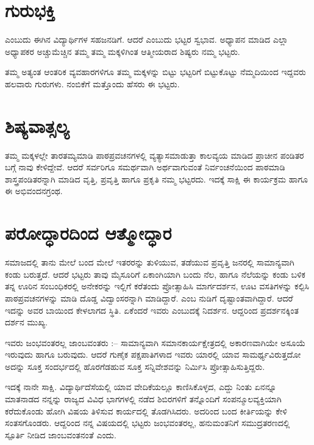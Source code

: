 \section*{ಗುರುಭಕ್ತಿ}  

   ಎಂಬುದು ಈಗಿನ ವಿದ್ಯಾರ್ಥಿಗಳ ಸಹಜನಡಿಗೆ.  ಆದರೆ   ಎಂಬುದು ಭಟ್ಟರ ಸ್ವಭಾವ.  ಅಧ್ಯಾಪನ ಮಾಡಿದ ಎಲ್ಲಾ ಅಧ್ಯಾಪಕರ ಅಚ್ಚುಮೆಚ್ಚಿನ ತಮ್ಮ ತಮ್ಮ ಮಕ್ಕಳಿಗಿಂತ ಆತ್ಮೀಯರಾದ ಶಿಷ್ಯರು ನಮ್ಮ ಭಟ್ಟರು.

ತಮ್ಮ ಅತ್ಯಂತ ಆಂತರಿಕ ವ್ಯವಹಾರಗಳಿಗೂ ತಮ್ಮ ಮಕ್ಕಳನ್ನು ಬಿಟ್ಟು ಭಟ್ಟರಿಗೆ ಬಿಟ್ಟುಕೊಟ್ಟು ನೆಮ್ಮದಿಯಿಂದ ಇದ್ದವರು ಹಲವಾರು ಗುರುಗಳು. ನಂಬಿಕೆಗೆ ಮತ್ತೊಂದು ಹೆಸರು ಈ ಭಟ್ಟರು.

\section*{ಶಿಷ್ಯವಾತ್ಸಲ್ಯ} 

ತಮ್ಮ ಮಕ್ಕಳಲ್ಲೇ ತಾರತಮ್ಯಮಾಡಿ ಪಾಠಪ್ರವಚನಗಳಲ್ಲಿ ವ್ಯತ್ಯಾಸಮಾಡುತ್ತಾ ಕಾಲವ್ಯಯ ಮಾಡಿದ ಪ್ರಾಚೀನ ಪಂಡಿತರ ಬಗ್ಗೆ ನಾವು ಕೇಳಿದ್ದೇವೆ.  ಆದರೆ ಸರ್ವರಿಗೂ ಸಮರ್ಥವಾಗಿ ಅರ್ಥವಾಗುವಂತೆ ನಿರ್ವಂಚನೆಯಿಂದ ಪಾಠಮಾಡಿ ಶಾಸ್ತ್ರಪಂಡಿತರನ್ನಾಗಿ ಮಾಡಿದ ವೃತ್ತಿ, ಪ್ರವೃತ್ತಿ ಹಾಗೂ ಪ್ರಕೃತಿ ನಮ್ಮ ಭಟ್ಟರದು.  ಇದಕ್ಕೆ ಸಾಕ್ಷಿ ಈ ಕಾರ್ಯಕ್ರಮ ಹಾಗೂ ಈ ಅಭಿವಂದನಗ್ರಂಥ.

\section*{ಪರೋದ್ಧಾರದಿಂದ ಆತ್ಮೋದ್ಧಾರ} 

ಸಮಾಜದಲ್ಲಿ ತಾನು ಮೇಲೆ ಬಂದ ಮೇಲೆ ಇತರರನ್ನು ತುಳಿಯುವ, ತಡೆಯುವ ಪ್ರವೃತ್ತಿ ಜನರಲ್ಲಿ ಸಾಮಾನ್ಯವಾಗಿ ಕಂಡು ಬರುತ್ತದೆ.  ಆದರೆ ಭಟ್ಟರು ತಾವು ಮೈಸೂರಿಗೆ ಏಕಾಂಗಿಯಾಗಿ ಬಂದು ನೆಲ, ಹಾಗೂ ನೆಲೆಯನ್ನು ಕಂಡು ಬಳಿಕ ತನ್ನ ಊರಿನ  ಸಂಬಂಧಿಕರಲ್ಲಿ ಅನೇಕರನ್ನು ಇಲ್ಲಿಗೆ ಕರೆತಂದು ಪ್ರೋತ್ಸಾಹಿಸಿ ಮಾರ್ಗದರ್ಶನ, ಊಟ ವಸತಿಗಳನ್ನು ಕಲ್ಪಿಸಿ ಪಾಠಪ್ರವಚನಗಳನ್ನು ಮಾಡಿ ದೊಡ್ಡ ವಿದ್ವಾಂಸರನ್ನಾಗಿ ಮಾಡಿದ್ದಾರೆ.  ಎಂಬ ನುಡಿಗೆ ದೃಷ್ಟಾಂತವಾಗಿದ್ದಾರೆ.  ಆದರೆ ಇದನ್ನು ಅವರ ಬಾಯಿಂದ ಕೇಳಲಾಗದ ಸ್ಥಿತಿ.  ಏಕೆಂದರೆ ಇವರು   ಎಂಬುದಕ್ಕೆ ನಿದರ್ಶನ. ಆದ್ದರಿಂದ ಪ್ರದರ್ಶನಕ್ಕಿಂತ ದರ್ಶನ ಮುಖ್ಯ. 

ಇವರು ಜಂಭವಂತರಲ್ಲ ಜಾಂಬವಂತರು :–  ಸಾಮಾನ್ಯವಾಗಿ ಸಮಾನಕಾರ್ಯಕ್ಷೇತ್ರದಲ್ಲಿ ಅಕಾರಣವಾಗಿಯೇ ಅಸೂಯೆ ಇರುವುದು ಹಾಗೂ ಬರುವುದು.  ಆದರೆ ಗುಣೈಕ ಪಕ್ಷಪಾತಿಗಳಾದ ಇವರು ಯಾರಲ್ಲಿ ಯಾವ ಸಾಮರ್ಥ್ಯವಿರುತ್ತದೋ ಅದನ್ನು ಸೂಕ್ತ ಸಂದರ್ಭದಲ್ಲಿ ಹೊರಗೆಡಹುವ  ಸೂಕ್ತ ಸನ್ನಿವೇಶವನ್ನು ನಿರ್ಮಿಸಿ ಪ್ರೋತ್ಸಾಹಿಸುತ್ತಿದ್ದರು. 

ಇದಕ್ಕೆ ನಾನೇ ಸಾಕ್ಷಿ.  ವಿದ್ಯಾರ್ಥಿದೆಸೆಯಲ್ಲಿ ಯಾವ ವೇದಿಕೆಯಲ್ಲೂ ಕಾಣಿಸಿಕೊಳ್ಳದ, ಎದ್ದು ನಿಂತು ಏನನ್ನೂ ಮಾತನಾಡದ ನನ್ನನ್ನು ರಾಜ್ಯದ ವಿವಿಧ ಭಾಗಗಳಲ್ಲಿ ನಡೆದ ಶಿಬಿರಗಳಿಗೆ ತನ್ನೊಂದಿಗೆ ಸಂಪನ್ಮೂಲವ್ಯಕ್ತಿಯಾಗಿ ಕರೆದುಕೊಂಡು ಹೋಗಿ ವಿಷಯ ತಿಳಿಸುವ ಕಾರ್ಯದಲ್ಲಿ ತೊಡಗಿಸಿದರು.  ಅದರಿಂದ ಬಂದ ಕೀರ್ತಿಯನ್ನು ಕೇಳಿ ಸಂತಸಗೊಂಡರು.  ಆದ್ದರಿಂದ ನನ್ನ ವಿಷಯದಲ್ಲಿ ಭಟ್ಟರು ಜಂಭವಂತರಲ್ಲ,  ಹನುಮಂತನಿಗೆ  ಸಮುದ್ರತರಣದಲ್ಲಿ  ಸ್ಪೂರ್ತಿ ನೀಡಿದ  ಜಾಂಬವಂತನಂತೆ ಎಂದು.


